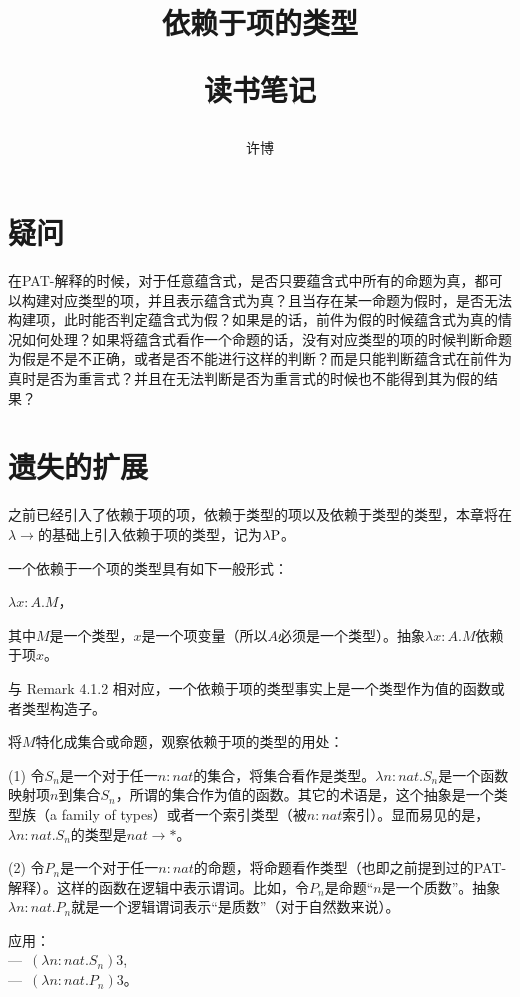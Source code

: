 \documentclass[UTF8]{article}
\title{依赖于项的类型\\[2ex]\begin{large}读书笔记\end{large}}
\author{许博}
\date{}
\begin{document}
\maketitle
	\section{疑问}
		在PAT-解释的时候，对于任意蕴含式，是否只要蕴含式中所有的命题为真，都可以构建对应类型的项，并且表示蕴含式为真？且当存在某一命题为假时，是否无法构建项，此时能否判定蕴含式为假？如果是的话，前件为假的时候蕴含式为真的情况如何处理？如果将蕴含式看作一个命题的话，没有对应类型的项的时候判断命题为假是不是不正确，或者是否不能进行这样的判断？而是只能判断蕴含式在前件为真时是否为重言式？并且在无法判断是否为重言式的时候也不能得到其为假的结果？

	\section{遗失的扩展}
		之前已经引入了依赖于项的项，依赖于类型的项以及依赖于类型的类型，本章将在$\lambda{\rightarrow}$的基础上引入依赖于项的类型，记为$\lambda{\rm P}$。
		
		一个依赖于一个项的类型具有如下一般形式：
		
		\begin{center}
			$\lambda x:A.M$，
		\end{center}
	
		其中$M$是一个类型，$x$是一个项变量（所以$A$必须是一个类型）。抽象$\lambda x:A.M$依赖于项$x$。
		
		与 Remark 4.1.2 相对应，一个依赖于项的类型事实上是一个类型作为值的函数或者类型构造子。
		
		将$M$特化成集合或命题，观察依赖于项的类型的用处：
		
		(1) 令$S_n$是一个对于任一$n:nat$的集合，将集合看作是类型。$\lambda n:nat.S_n$是一个函数映射项$n$到集合$S_n$，所谓的集合作为值的函数。其它的术语是，这个抽象是一个类型族（a family of types）或者一个索引类型（被$n:nat$索引）。显而易见的是，$\lambda n:nat.S_n$的类型是$nat\rightarrow*$。
		
		(2) 令$P_n$是一个对于任一$n:nat$的命题，将命题看作类型（也即之前提到过的PAT-解释）。这样的函数在逻辑中表示谓词。比如，令$P_n$是命题“$n$是一个质数”。抽象$\lambda n:nat.P_n$就是一个逻辑谓词表示“是质数”（对于自然数来说）。
		
		应用：\\—\ $(\lambda n:nat.S_n)3$,\\—\ $(\lambda n:nat.P_n)3$。
		
\end{document}

